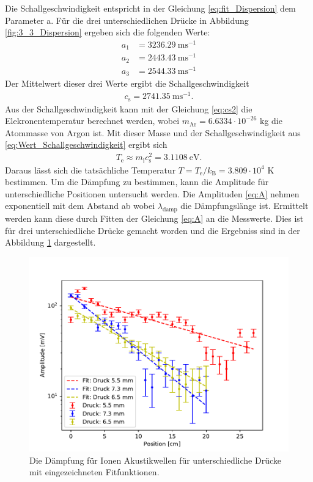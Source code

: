 Die Schallgeschwindigkeit entspricht in der Gleichung \eqref{eq:fit_Dispersion} dem Parameter a. Für die drei unterschiedlichen Drücke in Abbildung \ref{fig:3_3_Dispersion} ergeben sich die folgenden Werte:
\begin{align}
  a_1 & = 3236.29\  \mathrm{m s}^{-1} \\
  a_2 & = 2443.43\  \mathrm{m s}^{-1} \\
  a_3 & = 2544.33\  \mathrm{m s}^{-1}
\end{align}
Der Mittelwert dieser drei Werte ergibt die Schallgeschwindigkeit
\begin{align}
  c_{\mathrm{s}}= 2741.35\  \mathrm{m s}^{-1}.
  \label{eq:Wert_Schallgeschwindigkeit}
\end{align}
Aus der Schallgeschwindigkeit kann mit der Gleichung \eqref{eq:cs2} die Elekronentemperatur berechnet werden, wobei $ m_{\mathrm{Ar}}=6.6334 \cdot 10^{-26}$ kg \cite{wiki:Argon}  die Atommasse von Argon  ist. Mit dieser Masse und der Schallgeschwindigkeit aus \eqref{eq:Wert_Schallgeschwindigkeit} ergibt sich
\begin{align}
   T_{\mathrm{e}} \approx m_{\mathrm{i}} c_{\mathrm{s}}^2= 3.1108\ \mathrm{eV}.
  \end{align} 
Daraus lässt sich die tatsächliche Temperatur $T=T_{\mathrm{e}}/k_{\mathrm{B}}=3.809 \cdot 10^4$ K bestimmen.  Um die Dämpfung zu bestimmen, kann die Amplitude für unterschiedliche Positionen untersucht werden. Die Amplituden \eqref{eq:A} nehmen exponentiell mit dem Abstand ab
wobei $\lambda_{\mathrm{damp}}$ die Dämpfungslänge ist. Ermittelt werden kann diese durch Fitten der Gleichung \eqref{eq:A} an die Messwerte. Dies ist für drei unterschiedliche Drücke gemacht worden und die Ergebniss sind in der Abbildung \ref {fig:3_3_Daempfung} dargestellt. 
\begin{figure}[H]
\centering
\includegraphics[scale=0.6]{3_3_Daempfung.pdf}
\caption{Die Dämpfung für Ionen Akustikwellen für unterschiedliche Drücke mit eingezeichneten Fitfunktionen.}
\label{fig:3_3_Daempfung}
\end{figure}
